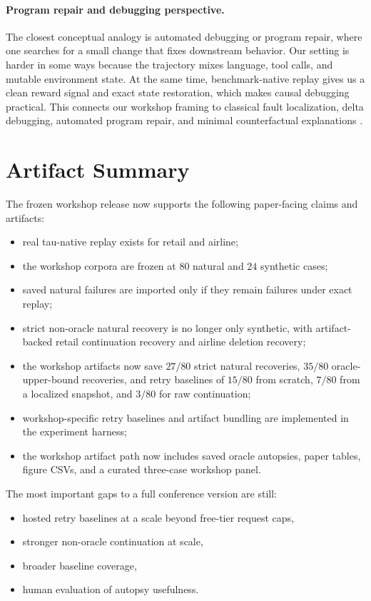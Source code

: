 \documentclass{article}
\begin{document}
\paragraph{Program repair and debugging perspective.}
The closest conceptual analogy is automated debugging or program repair, where
one searches for a small change that fixes downstream behavior. Our setting is
harder in some ways because the trajectory mixes language, tool calls, and
mutable environment state. At the same time, benchmark-native replay gives us a
clean reward signal and exact state restoration, which makes causal debugging
practical. This connects our workshop framing to classical fault localization,
delta debugging, automated program repair, and minimal counterfactual
explanations \citep{fault_localization,delta_debugging,program_repair,minimal_counterfactuals}.

\section{Artifact Summary}

The frozen workshop release now supports the following paper-facing claims and
artifacts:
\begin{itemize}
  \item real tau-native replay exists for retail and airline;
  \item the workshop corpora are frozen at $80$ natural and $24$ synthetic
  cases;
  \item saved natural failures are imported only if they remain failures under
  exact replay;
  \item strict non-oracle natural recovery is no longer only synthetic, with
  artifact-backed retail continuation recovery and airline deletion recovery;
  \item the workshop artifacts now save $27/80$ strict natural
  recoveries, $35/80$ oracle-upper-bound recoveries, and retry baselines of
  $15/80$ from scratch, $7/80$ from a localized snapshot, and $3/80$ for raw
  continuation;
  \item workshop-specific retry baselines and artifact bundling are implemented
  in the experiment harness;
  \item the workshop artifact path now includes saved oracle autopsies, paper
  tables, figure CSVs, and a curated three-case workshop panel.
\end{itemize}

The most important gaps to a full conference version are still:
\begin{itemize}
  \item hosted retry baselines at a scale beyond free-tier request caps,
  \item stronger non-oracle continuation at scale,
  \item broader baseline coverage,
  \item human evaluation of autopsy usefulness.
\end{itemize}
\end{document}
